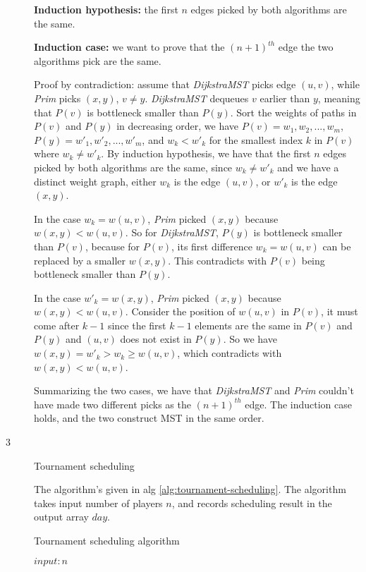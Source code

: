 \documentclass{article}
\begin{document}
\begin{description}
  \textbf{Induction hypothesis:} the first $n$ edges picked by both algorithms are the same. 

  \textbf{Induction case:} we want to prove that the $(n+1)^{th}$ edge the two algorithms pick are the same. 

  Proof by contradiction: assume that \textit{DijkstraMST} picks edge $(u,v)$, while \textit{Prim} picks $(x,y)$, $v \neq y$. \textit{DijkstraMST} dequeues $v$ earlier than $y$, meaning that $P(v)$ is bottleneck smaller than $P(y)$. Sort the weights of paths in $P(v)$ and $P(y)$ in decreasing order, we have $P(v) = {w_1, w_2, ..., w_m}$, $P(y) = {w'_1, w'_2, ..., w'_m}$, and $w_k < w'_k$ for the smallest index $k$ in $P(v)$ where $w_k \neq w'_k$. By induction hypothesis, we have that the first $n$ edges picked by both algorithms are the same, since $w_k \neq w'_k$ and we have a distinct weight graph, either $w_k$ is the edge $(u,v)$, or $w'_k$ is the edge $(x,y)$. 

  In the case $w_k = w(u,v)$, \textit{Prim} picked $(x,y)$ because $w(x,y) < w(u,v)$. So for \textit{DijkstraMST}, $P(y)$ is bottleneck smaller than $P(v)$, because for $P(v)$, its first difference $w_k = w(u,v)$ can be replaced by a smaller $w(x,y)$. This contradicts with $P(v)$ being bottleneck smaller than $P(y)$.

  In the case $w'_k = w(x,y)$, \textit{Prim} picked $(x,y)$ because $w(x,y) < w(u,v)$. Consider the position of $w(u,v)$ in $P(v)$, it must come after $k - 1$ since the first $k - 1$ elements are the same in $P(v)$ and $P(y)$ and $(u,v)$ does not exist in $P(y)$. So we have $w(x,y) = w'_k > w_k \geq w(u,v)$, which contradicts with $w(x,y) < w(u,v)$.

  Summarizing the two cases, we have that \textit{DijkstraMST} and \textit{Prim} couldn't have made two different picks as the $(n+1)^{th}$ edge. The induction case holds, and the two construct MST in the same order.

\item[3]{Tournament scheduling}

  The algorithm's given in alg \ref{alg:tournament-scheduling}. The algorithm takes input number of players $n$, and records scheduling result in the output array $day$.
  
  \begin{algorithm}[H]
  \caption{Tournament scheduling algorithm}
  \label{alg:tournament-scheduling}
    \begin{algorithmic}[1]

    \State $input: n$


\end{algorithmic}
\end{algorithm}
\end{description}
\end{document}
